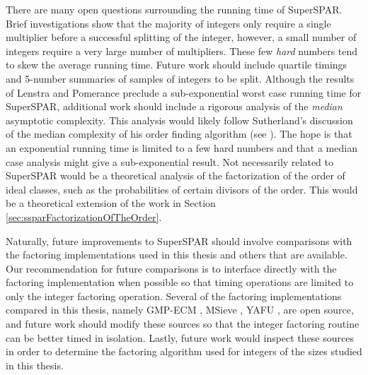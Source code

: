 \documentclass{ucalgthes1}
\theoremstyle{definition}
\begin{document}
There are many open questions surrounding the running time of SuperSPAR.  Brief investigations show that the majority of integers only require a single multiplier before a successful splitting of the integer, however, a small number of integers require a very large number of multipliers.  These few \emph{hard} numbers tend to skew the average running time.  Future work should include quartile timings and 5-number summaries of samples of integers to be split.  Although the results of Lenstra and Pomerance \cite[\S 11]{Lenstra1992} preclude a sub-exponential worst case running time for SuperSPAR, additional work should include a rigorous analysis of the \emph{median} asymptotic complexity.  This analysis would likely follow Sutherland's discussion of the median complexity of his order finding algorithm (see \cite[\S 5.4]{Sutherland2007}).  The hope is that an exponential running time is limited to a few hard numbers and that a median case analysis might give a sub-exponential result.  Not necessarily related to SuperSPAR would be a theoretical analysis of the factorization of the order of ideal classes, such as the probabilities of certain divisors of the order.  This would be a theoretical extension of the work in Section \ref{sec:ssparFactorizationOfTheOrder}.

Naturally, future improvements to SuperSPAR should involve comparisons with the factoring implementations used in this thesis and others that are available.  Our recommendation for future comparisons is to interface directly with the factoring implementation when possible so that timing operations are limited to only the integer factoring operation.  Several of the factoring implementations compared in this thesis, namely GMP-ECM \cite{Ecm}, MSieve \cite{Msieve}, YAFU \cite{Yafu}, are open source, and future work should modify these sources so that the integer factoring routine can be better timed in isolation.  Lastly, future work would inspect these sources in order to determine the factoring algorithm used for integers of the sizes studied in this thesis.




\end{document}
